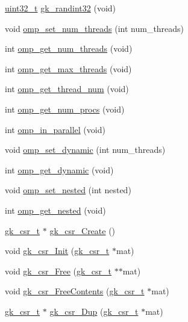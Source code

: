 \begin{DoxyCompactItemize}
\hyperlink{a00119_a6eb1e68cc391dd753bc8ce896dbb8315}{uint32\+\_\+t} \hyperlink{a00077_a8e801d60d0dbdf0213d39cf210cddf11}{gk\+\_\+randint32} (void)
\item 
void \hyperlink{a00077_ab2a1aadbe72ac6b1f9aed9a2ef8e0044}{omp\+\_\+set\+\_\+num\+\_\+threads} (int num\+\_\+threads)
\item 
int \hyperlink{a00077_a9ed0474735f00e49f9e37e8c76e935e5}{omp\+\_\+get\+\_\+num\+\_\+threads} (void)
\item 
int \hyperlink{a00077_aa00d2b875207d14eba24b62e65e795dd}{omp\+\_\+get\+\_\+max\+\_\+threads} (void)
\item 
int \hyperlink{a00077_afd4d1cfdcccf111a8ab472b1fef44d7f}{omp\+\_\+get\+\_\+thread\+\_\+num} (void)
\item 
int \hyperlink{a00077_a669d6cb8c2e92e8b13df20e9c089f730}{omp\+\_\+get\+\_\+num\+\_\+procs} (void)
\item 
int \hyperlink{a00077_afc9d0c25c3e17b17c0b5c53d87f0d36d}{omp\+\_\+in\+\_\+parallel} (void)
\item 
void \hyperlink{a00077_ab6a58432bb2a752acffcab65ec7feb68}{omp\+\_\+set\+\_\+dynamic} (int num\+\_\+threads)
\item 
int \hyperlink{a00077_af6a3613a1eb4247a2f419c194df7f5df}{omp\+\_\+get\+\_\+dynamic} (void)
\item 
void \hyperlink{a00077_a371bb992a1b3b50415ba10614f52e1e7}{omp\+\_\+set\+\_\+nested} (int nested)
\item 
int \hyperlink{a00077_a1ac016a437ca14b410b4acf04af76257}{omp\+\_\+get\+\_\+nested} (void)
\item 
\hyperlink{a00634}{gk\+\_\+csr\+\_\+t} $\ast$ \hyperlink{a00077_a82b885bbed5bd18c26629c35ce5d37e4}{gk\+\_\+csr\+\_\+\+Create} ()
\item 
void \hyperlink{a00077_a47a303d88c3316bd821219cae39d0461}{gk\+\_\+csr\+\_\+\+Init} (\hyperlink{a00634}{gk\+\_\+csr\+\_\+t} $\ast$mat)
\item 
void \hyperlink{a00077_ac3736361b8d6b391356f273c960c203b}{gk\+\_\+csr\+\_\+\+Free} (\hyperlink{a00634}{gk\+\_\+csr\+\_\+t} $\ast$$\ast$mat)
\item 
void \hyperlink{a00077_a9646f29b0605ba264bf373c441a6826d}{gk\+\_\+csr\+\_\+\+Free\+Contents} (\hyperlink{a00634}{gk\+\_\+csr\+\_\+t} $\ast$mat)
\item 
\hyperlink{a00634}{gk\+\_\+csr\+\_\+t} $\ast$ \hyperlink{a00077_a24144cf4c30d5ec4ed8b488d371476b3}{gk\+\_\+csr\+\_\+\+Dup} (\hyperlink{a00634}{gk\+\_\+csr\+\_\+t} $\ast$mat)
\item 
$$
\end{DoxyCompactItemize}
